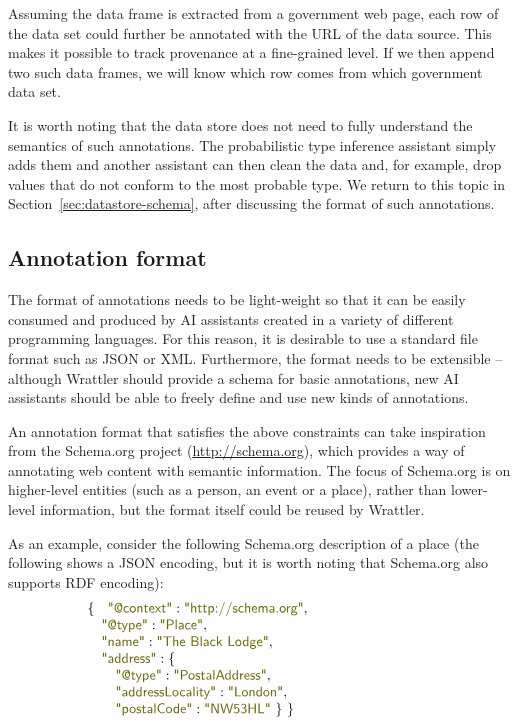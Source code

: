 \documentclass[sigplan,preprint,10pt]{acmart}\settopmatter{printfolios=true,printccs=false,printacmref=false}
\theoremstyle{plain}
\theoremstyle{definition}
\newcommand{\str}[1]{\textnormal{\textcolor{strclr}{\sffamily "#1"}}}
\begin{document}
\noindent
Assuming the data frame is extracted from a government web page, each row of the data set
could further be annotated with the URL of the data source. This makes it possible to track
provenance at a fine-grained level. If we then append two such data frames, we will know
which row comes from which government data set.

It is worth noting that the data store does not need to fully understand the semantics of such 
annotations. The probabilistic type inference assistant simply adds them and another assistant
can then clean the data and, for example, drop values that do not conform to the most 
probable type. We return to this topic in Section~\ref{sec:datastore-schema}, after discussing
the format of such annotations.

\subsection{Annotation format}
The format of annotations needs to be light-weight so that it can be easily consumed and produced
by AI assistants created in a variety of different programming languages. For this reason, it is
desirable to use a standard file format such as JSON or XML. Furthermore, the format needs to 
be extensible -- although Wrattler should provide a schema for basic annotations, new AI assistants
should be able to freely define and use new kinds of annotations.

An annotation format that satisfies the above constraints can take inspiration from the 
Schema.org project (\url{http://schema.org}), which provides a way of annotating web content
with semantic information. The focus of Schema.org is on higher-level entities (such as 
a person, an event or a place), rather than lower-level information, but the format itself could
be reused by Wrattler.

As an example, consider the following Schema.org description of a place (the following shows a
JSON encoding, but it is worth noting that Schema.org also supports RDF encoding):
%
\begin{equation*}
\begin{array}{l}
\{~~\; \str{@context}: \str{http://schema.org},\\
\quad  \str{@type}: \str{Place},\\
\quad  \str{name}: \str{The Black Lodge},\\
\quad  \str{address}: \{\\
\qquad    \str{@type}: \str{PostalAddress},\\
\qquad    \str{addressLocality}: \str{London},\qquad\qquad\qquad\qquad\qquad~\\
\qquad    \str{postalCode}: \str{NW53HL} ~\}~\}\\
\end{array}
\end{equation*}
\end{document}
